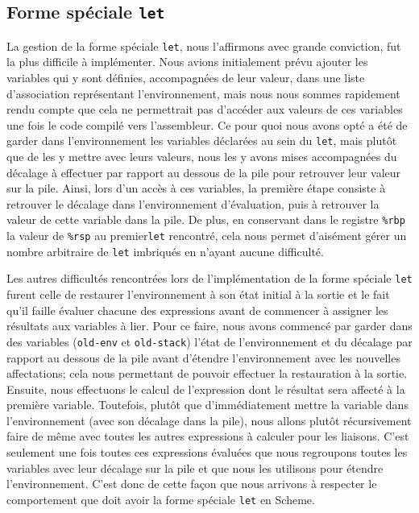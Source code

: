 \documentclass[12pt]{article}
\begin{document}
\subsection{Forme spéciale \texttt{let}}
La gestion de la forme spéciale \texttt{let}, nous l'affirmons avec grande conviction, fut la plus difficile à implémenter. Nous avions initialement prévu ajouter les variables qui y sont définies, accompagnées de leur valeur, dans une liste d'association représentant l'environnement, mais nous nous sommes rapidement rendu compte que cela ne permettrait pas d'accéder aux valeurs de ces variables une fois le code compilé vers l'assembleur. Ce pour quoi nous avons opté a été de garder dans l'environnement les variables déclarées au sein du  \texttt{let}, mais plutôt que de les y mettre avec leurs valeurs, nous les y avons mises accompagnées du décalage à effectuer par rapport au dessous de la pile pour retrouver leur valeur sur la pile. Ainsi, lors d'un accès à ces variables, la première étape consiste à retrouver le décalage dans l'environnement d'évaluation, puis à retrouver la valeur de cette variable dans la pile. De plus, en conservant dans le registre \texttt{\%rbp} la valeur de \texttt{\%rsp} au premier\texttt{let} rencontré, cela nous permet d'aisément gérer un nombre arbitraire de \texttt{let} imbriqués en n'ayant aucune difficulté.

Les autres difficultés rencontrées lors de l'implémentation de la forme spéciale \texttt{let} furent celle de restaurer l'environnement à son état initial à la sortie et le fait qu'il faille évaluer chacune des expressions avant de commencer à assigner les résultats aux variables à lier. Pour ce faire, nous avons commencé par garder dans des variables (\texttt{old-env} et \texttt{old-stack}) l'état de l'environnement et du décalage par rapport au dessous de la pile avant d'étendre l'environnement avec les nouvelles affectations; cela nous permettant de pouvoir effectuer la restauration à la sortie. Ensuite, nous effectuons le calcul de l'expression dont le résultat sera affecté à la première variable. Toutefois, plutôt que d'immédiatement mettre la variable dans l'environnement (avec son décalage dans la pile), nous allons plutôt récursivement faire de même avec toutes les autres expressions à calculer pour les liaisons. C'est seulement une fois toutes ces expressions évaluées que nous regroupons toutes les variables avec leur décalage sur la pile et que nous les utilisons pour étendre l'environnement. C'est donc de cette façon que nous arrivons à respecter le comportement que doit avoir la forme spéciale \texttt{let} en Scheme.
\end{document}
